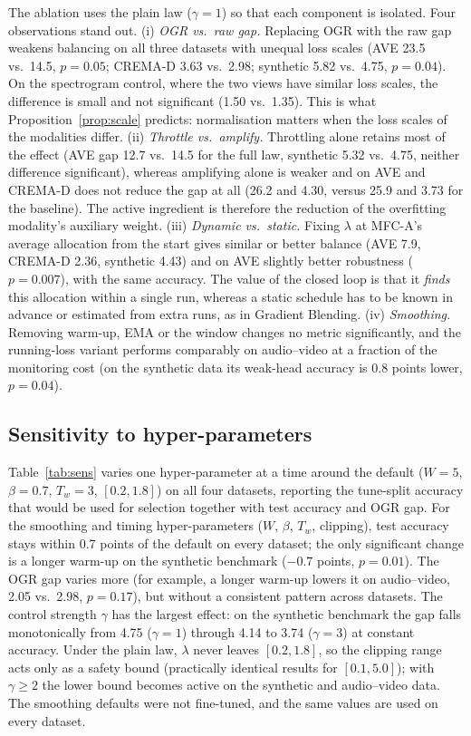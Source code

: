 \documentclass[fleqn,10pt]{wlscirep}
\begin{document}
The ablation uses the plain law ($\gamma{=}1$) so that each component is isolated. Four observations stand out. (i) \emph{OGR vs.\ raw gap.} Replacing OGR with the raw gap weakens balancing on all three datasets with unequal loss scales (AVE 23.5 vs.\ 14.5, $p{=}0.05$; CREMA-D 3.63 vs.\ 2.98; synthetic 5.82 vs.\ 4.75, $p{=}0.04$). On the spectrogram control, where the two views have similar loss scales, the difference is small and not significant (1.50 vs.\ 1.35). This is what Proposition~\ref{prop:scale} predicts: normalisation matters when the loss scales of the modalities differ. (ii) \emph{Throttle vs.\ amplify.} Throttling alone retains most of the effect (AVE gap 12.7 vs.\ 14.5 for the full law, synthetic 5.32 vs.\ 4.75, neither difference significant), whereas amplifying alone is weaker and on AVE and CREMA-D does not reduce the gap at all (26.2 and 4.30, versus 25.9 and 3.73 for the baseline). The active ingredient is therefore the reduction of the overfitting modality's auxiliary weight. (iii) \emph{Dynamic vs.\ static.} Fixing $\lambda$ at MFC-A's average allocation from the start gives similar or better balance (AVE 7.9, CREMA-D 2.36, synthetic 4.43) and on AVE slightly better robustness ($p{=}0.007$), with the same accuracy. The value of the closed loop is that it \emph{finds} this allocation within a single run, whereas a static schedule has to be known in advance or estimated from extra runs, as in Gradient Blending. (iv) \emph{Smoothing.} Removing warm-up, EMA or the window changes no metric significantly, and the running-loss variant performs comparably on audio--video at a fraction of the monitoring cost (on the synthetic data its weak-head accuracy is 0.8 points lower, $p{=}0.04$).

\subsection*{Sensitivity to hyper-parameters}
Table~\ref{tab:sens} varies one hyper-parameter at a time around the default ($W{=}5$, $\beta{=}0.7$, $T_w{=}3$, $[0.2,1.8]$) on all four datasets, reporting the tune-split accuracy that would be used for selection together with test accuracy and OGR gap. For the smoothing and timing hyper-parameters ($W$, $\beta$, $T_w$, clipping), test accuracy stays within 0.7 points of the default on every dataset; the only significant change is a longer warm-up on the synthetic benchmark ($-0.7$ points, $p{=}0.01$). The OGR gap varies more (for example, a longer warm-up lowers it on audio--video, 2.05 vs.\ 2.98, $p{=}0.17$), but without a consistent pattern across datasets. The control strength $\gamma$ has the largest effect: on the synthetic benchmark the gap falls monotonically from 4.75 ($\gamma{=}1$) through 4.14 to 3.74 ($\gamma{=}3$) at constant accuracy. Under the plain law, $\lambda$ never leaves $[0.2,1.8]$, so the clipping range acts only as a safety bound (practically identical results for $[0.1,5.0]$); with $\gamma\ge2$ the lower bound becomes active on the synthetic and audio--video data. The smoothing defaults were not fine-tuned, and the same values are used on every dataset.
\end{document}
